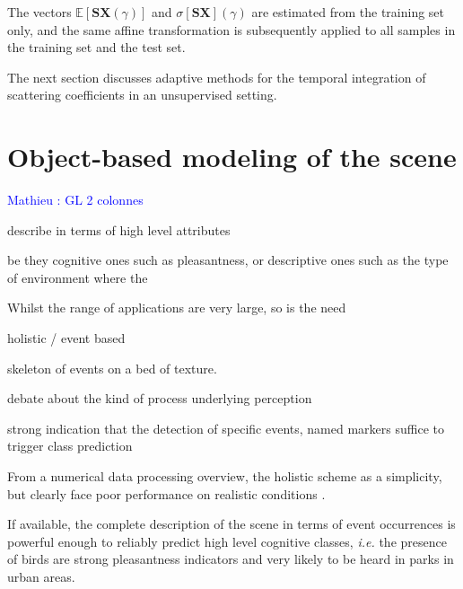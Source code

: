 \documentclass[journal]{IEEEtran}
\newcommand{\ml}[1]{\textcolor{blue}{ Mathieu : #1}}
\begin{document}
 The vectors $\mathbb{E}[\mathbf{S}\boldsymbol{X}(\gamma)]$ and $\sigma[\mathbf{S}\boldsymbol{X}](\gamma)$ are estimated from the training set only, and the same affine transformation is subsequently applied to all samples in the training set and the test set.
 
The next section discusses adaptive methods for the temporal integration of scattering coefficients in an unsupervised setting.

\section{Object-based modeling of the scene}

\ml{GL 2 colonnes}

describe in terms of high level attributes

be they cognitive ones such as pleasantness, or descriptive ones such as the type of environment where the 



Whilst the range of applications are very large, so is the need

holistic / event based

skeleton of events on a bed of texture.

debate about the kind of process underlying perception

strong indication that the detection of specific events, named markers suffice to trigger class prediction

From a numerical data processing overview, the holistic scheme as a simplicity, but clearly face poor performance on realistic conditions \cite{lagrange:hal-01082501}.

If available, the complete description of the scene in terms of event occurrences is powerful enough to reliably predict high level cognitive classes, \textit{i.e.} the presence of birds are strong pleasantness indicators and very likely to be heard in parks in urban areas.
\end{document}
